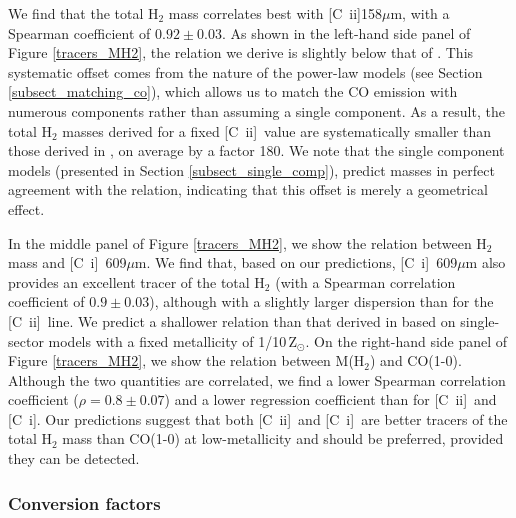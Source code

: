 \documentclass{aa}
\newcommand{\toadd}[1]{{\color{red}{{[TO ADD: \bf #1]}}}}
\newcommand{\ci}{[C~{\sc i}]}
\newcommand{\cii}{[C~{\sc ii}]}
\begin{document}
We find that the total H$_2$ mass correlates best with \cii 158$\mu$m, with a Spearman coefficient of $0.92 \pm 0.03$. As shown in the left-hand side panel of  Figure \ref{tracers_MH2}, the relation we derive is slightly below that of . This systematic offset comes from the nature of the power-law models (see Section \ref{subsect_matching_co}), which allows us to match the CO emission with numerous components rather than assuming a single component. As a result, the total H$_2$ masses derived for a fixed \cii\ value are systematically smaller than those derived in , on average by a factor 180. %
We note that the single component models (presented in Section \ref{subsect_single_comp}), predict masses in perfect agreement with the  relation, indicating that this offset is merely a geometrical effect. 

In the middle panel of Figure \ref{tracers_MH2}, we show the relation between H$_2$ mass and \ci\ 609$\mu$m. We find that, based on our predictions, \ci\ 609$\mu$m also provides an excellent tracer of the total H$_2$ (with a Spearman correlation coefficient of $0.9 \pm 0.03$), although with a slightly larger dispersion than for the \cii\ line. We predict a shallower relation than that derived in  based on single-sector models with a fixed metallicity of 1/10\,Z$_{\odot}$. %
On the right-hand side panel of Figure \ref{tracers_MH2}, we show the relation between M(H$_2$) and CO(1-0). Although the two quantities are correlated, we find a lower Spearman correlation coefficient ($\rho=0.8 \pm 0.07$) and a lower regression coefficient than for \cii\  and \ci. Our predictions suggest that both \cii\ and \ci\ are better tracers of the total H$_2$ mass than CO(1-0) at low-metallicity and should be preferred, provided they can be detected.

\subsubsection{Conversion factors}
\label{subsect_conversion_factors}
\end{document}
